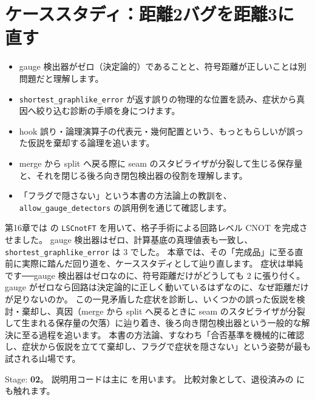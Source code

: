 \chapter{ケーススタディ：距離2バグを距離3に直す}\label{ch:distance_debug}

\begin{chaptergoal}
  \begin{itemize}
  \item gauge 検出器がゼロ（決定論的）であることと、符号距離が正しいことは別問題だと理解します。
  \item \texttt{shortest\_graphlike\_error} が返す誤りの物理的な位置を読み、症状から真因へ絞り込む診断の手順を身につけます。
  \item hook 誤り・論理演算子の代表元・幾何配置という、もっともらしいが誤った仮説を棄却する論理を追います。
  \item merge から split へ戻る際に seam のスタビライザが分裂して生じる保存量と、それを閉じる後ろ向き閉包検出器の役割を理解します。
  \item 「フラグで隠さない」という本書の方法論上の教訓を、\texttt{allow\_gauge\_detectors} の誤用例を通じて確認します。
  \end{itemize}
\end{chaptergoal}

第16章では  の \texttt{LSCnotFT} を用いて、格子手術による回路レベル CNOT を完成させました。
gauge 検出器はゼロ、計算基底の真理値表も一致し、\texttt{shortest\_graphlike\_error} は $3$ でした。
本章では、その「完成品」に至る直前に実際に踏んだ回り道を、ケーススタディとして辿り直します。
症状は単純です──gauge 検出器はゼロなのに、符号距離だけがどうしても $2$ に張り付く。
gauge がゼロなら回路は決定論的に正しく動いているはずなのに、なぜ距離だけが足りないのか。
この一見矛盾した症状を診断し、いくつかの誤った仮説を検討・棄却し、真因（merge から split へ戻るときに seam のスタビライザが分裂して生まれる保存量の欠落）に辿り着き、後ろ向き閉包検出器という一般的な解決に至る過程を追います。
本書の方法論、すなわち「合否基準を機械的に確認し、症状から仮説を立てて棄却し、フラグで症状を隠さない」という姿勢が最も試される山場です。

\begin{notebox}
  Stage: \textbf{02}。
  説明用コードは主に  を用います。
  比較対象として、退役済みの  にも触れます。
\end{notebox}

